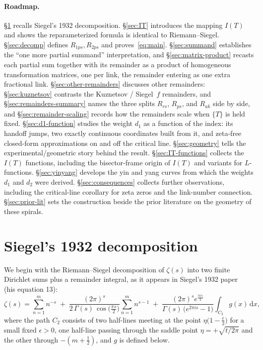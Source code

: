 \documentclass[11pt]{article}
\theoremstyle{definition}
\begin{document}
\paragraph{Roadmap.} \S\ref{sec:siegel} recalls Siegel's 1932 decomposition.
\S\ref{sec:IT} introduces the mapping $I(T)$ and shows the reparameterized
formula is identical to Riemann--Siegel. \S\ref{sec:decomp} defines
$R_{1ps},R_{2ps}$ and proves~\eqref{eq:main}. \S\ref{sec:summand} establishes the
``one more partial summand'' interpretation, and \S\ref{sec:matrix-product}
recasts each partial sum together with its remainder as a product of
homogeneous transformation matrices, one per link, the remainder entering as
one extra fractional link.
\S\ref{sec:other-remainders} discusses other remainders: \S\ref{sec:kuznetsov}
contrasts the Kuznetsov / Siegel~$f$ remainders, and
\S\ref{sec:remainders-summary} names the three splits $R_{rs}$, $R_{ps}$, and
$R_{ak}$ side by side, and \S\ref{sec:remainder-scaling} records how the
remainders scale when $\{T\}$ is held fixed.
\S\ref{sec:d1-function} studies the weight $d_1$ as a function of the index:
its handoff jumps, two exactly continuous coordinates built from it, and
zeta-free closed-form approximations on and off the critical line.
\S\ref{sec:geometry} tells the experimental/geometric story
behind the result. \S\ref{sec:IT-functions} collects the $I(T)$ functions,
including the bisector-frame origin of $I(T)$ and variants for
$L$-functions. \S\ref{sec:yinyang} develops the yin and yang
curves from which the weights $d_1$ and $d_2$ were derived.
\S\ref{sec:consequences} collects further observations, including the
critical-line corollary for zeta zeros and the link-number connection.
\S\ref{sec:prior-lit} sets the construction beside the prior literature on the
geometry of these spirals.

\section{Siegel's 1932 decomposition}\label{sec:siegel}

We begin with the Riemann--Siegel decomposition of $\zeta(s)$ into two finite
Dirichlet sums plus a remainder integral, as it appears in Siegel's 1932
paper~\cite{Siegel1932} (his equation 13):
\begin{equation}\label{eq:siegel13}
\zeta(s)
=
\sum_{n=1}^{m} n^{-s}
\;+\;
\frac{(2\pi)^s}{2\,\Gamma(s)\,\cos\!\bigl(\tfrac{\pi s}{2}\bigr)}
\sum_{n=1}^{m} n^{s-1}
\;+\;
\frac{(2\pi)^s e^{\tfrac{\pi i s}{2}}}{\Gamma(s)\,\bigl(e^{2\pi i s}-1\bigr)}
\int_{C_2} g(x)\,\mathrm{d}x,
\end{equation}
where the path $C_2$ consists of two half-lines meeting at the point
$\eta\bigl(1-\tfrac{\epsilon}{2}\bigr)$ for a small fixed $\epsilon>0$, one
half-line passing through the saddle point $\eta=+\sqrt{t/2\pi}$ and the
other through $-(m+\tfrac12)$, and $g$ is defined below.
\end{document}
